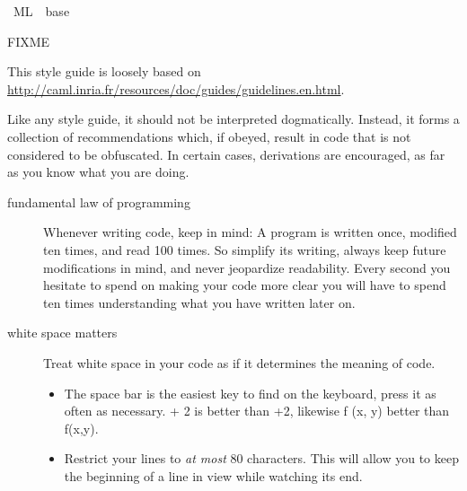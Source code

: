 %
\begin{isabellebody}%
\def\isabellecontext{ML}%
%
\isadelimtheory
\isanewline
\isanewline
\isanewline
%
\endisadelimtheory
%
\isatagtheory
{}\isamarkupfalse%
\ {\isachardoublequoteopen}ML{\isachardoublequoteclose}\ \ base\ %
\endisatagtheory
{\isafoldtheory}%
%
\isadelimtheory
%
\endisadelimtheory
%
\isamarkuptrue%
%
\begin{isamarkuptext}%
FIXME%
\end{isamarkuptext}%
\isamarkuptrue%
%
\begin{isamarkuptext}%
This style guide is loosely based on
  \url{http://caml.inria.fr/resources/doc/guides/guidelines.en.html}.

  Like any style guide, it should not be interpreted dogmatically.
  Instead, it forms a collection of recommendations which,
  if obeyed, result in code that is not considered to be
  obfuscated.  In certain cases, derivations are encouraged,
  as far as you know what you are doing.

  \begin{description}

    \item[fundamental law of programming]
      Whenever writing code, keep in mind: A program is
      written once, modified ten times, and read
      100 times.  So simplify its writing,
      always keep future modifications in mind,
      and never jeopardize readability.  Every second you hesitate
      to spend on making your code more clear you will
      have to spend ten times understanding what you have
      written later on.

    \item[white space matters]
      Treat white space in your code as if it determines
      the meaning of code.

      \begin{itemize}

        \item The space bar is the easiest key to find on the keyboard,
          press it as often as necessary. { + 2} is better
          than {+2}, likewise {\ttfamily f (x, y)}
          better than {\ttfamily f(x,y)}.

        \item Restrict your lines to \emph{at most} 80 characters.
          This will allow you to keep the beginning of a line
          in view while watching its end.


\end{itemize}
\end{description}
\end{isamarkuptext}
\end{isabellebody}
